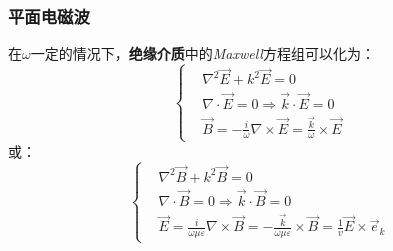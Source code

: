 \documentclass[12pt]{article}
\begin{document}
\subsubsection{平面电磁波}
在$\omega$一定的情况下，\textbf{绝缘介质}中的\textit{Maxwell}方程组可以化为：
\begin{equation}
    \left\{\begin{split}
        &\nabla^2 \Vec{E}+k^2\Vec{E}=0\\
         &\nabla\cdot\Vec{E}=0\Rightarrow \Vec{k}\cdot\Vec{E}=0\\
         &\Vec{B}=-\frac{i}{\omega}\nabla\times\Vec{E}=\frac{\Vec{k}}{\omega}\times\Vec{E}   
    \end{split}\right.
\end{equation}
或：
\begin{equation}
    \left\{\begin{split}
        &\nabla^2 \Vec{B}+k^2\Vec{B}=0\\
         &\nabla\cdot\Vec{B}=0\Rightarrow \Vec{k}\cdot\Vec{B}=0\\
         &\Vec{E}=\frac{i}{\omega\mu\varepsilon}\nabla\times\Vec{B}=-\frac{\Vec{k}}{\omega\mu\varepsilon}\times\Vec{B} =\frac{1}{v}\Vec{E}\times \vec{e}_k  
    \end{split}\right.
\end{equation}
\end{document}
